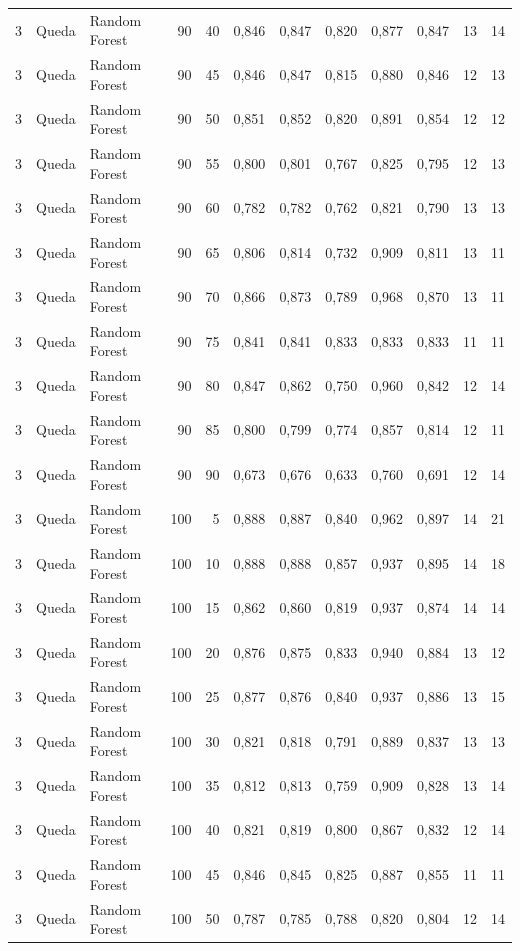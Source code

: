 \begin{longtable}{@{}rllrrrrrrrrr@{}}
3 & Queda & Random Forest & 90 & 40 & 0,846 & 0,847 & 0,820 & 0,877 & 0,847 & 13 & 14 \\
3 & Queda & Random Forest & 90 & 45 & 0,846 & 0,847 & 0,815 & 0,880 & 0,846 & 12 & 13 \\
3 & Queda & Random Forest & 90 & 50 & 0,851 & 0,852 & 0,820 & 0,891 & 0,854 & 12 & 12 \\
3 & Queda & Random Forest & 90 & 55 & 0,800 & 0,801 & 0,767 & 0,825 & 0,795 & 12 & 13 \\
3 & Queda & Random Forest & 90 & 60 & 0,782 & 0,782 & 0,762 & 0,821 & 0,790 & 13 & 13 \\
3 & Queda & Random Forest & 90 & 65 & 0,806 & 0,814 & 0,732 & 0,909 & 0,811 & 13 & 11 \\
3 & Queda & Random Forest & 90 & 70 & 0,866 & 0,873 & 0,789 & 0,968 & 0,870 & 13 & 11 \\
3 & Queda & Random Forest & 90 & 75 & 0,841 & 0,841 & 0,833 & 0,833 & 0,833 & 11 & 11 \\
3 & Queda & Random Forest & 90 & 80 & 0,847 & 0,862 & 0,750 & 0,960 & 0,842 & 12 & 14 \\
3 & Queda & Random Forest & 90 & 85 & 0,800 & 0,799 & 0,774 & 0,857 & 0,814 & 12 & 11 \\
3 & Queda & Random Forest & 90 & 90 & 0,673 & 0,676 & 0,633 & 0,760 & 0,691 & 12 & 14 \\
3 & Queda & Random Forest & 100 & 5 & 0,888 & 0,887 & 0,840 & 0,962 & 0,897 & 14 & 21 \\
3 & Queda & Random Forest & 100 & 10 & 0,888 & 0,888 & 0,857 & 0,937 & 0,895 & 14 & 18 \\
3 & Queda & Random Forest & 100 & 15 & 0,862 & 0,860 & 0,819 & 0,937 & 0,874 & 14 & 14 \\
3 & Queda & Random Forest & 100 & 20 & 0,876 & 0,875 & 0,833 & 0,940 & 0,884 & 13 & 12 \\
3 & Queda & Random Forest & 100 & 25 & 0,877 & 0,876 & 0,840 & 0,937 & 0,886 & 13 & 15 \\
3 & Queda & Random Forest & 100 & 30 & 0,821 & 0,818 & 0,791 & 0,889 & 0,837 & 13 & 13 \\
3 & Queda & Random Forest & 100 & 35 & 0,812 & 0,813 & 0,759 & 0,909 & 0,828 & 13 & 14 \\
3 & Queda & Random Forest & 100 & 40 & 0,821 & 0,819 & 0,800 & 0,867 & 0,832 & 12 & 14 \\
3 & Queda & Random Forest & 100 & 45 & 0,846 & 0,845 & 0,825 & 0,887 & 0,855 & 11 & 11 \\
3 & Queda & Random Forest & 100 & 50 & 0,787 & 0,785 & 0,788 & 0,820 & 0,804 & 12 & 14 \\

\end{longtable}
